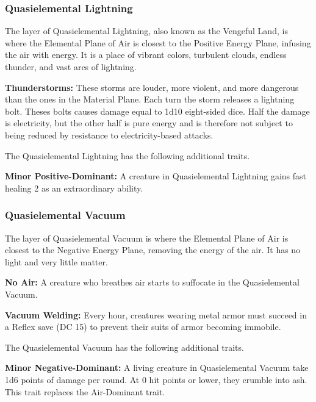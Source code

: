 \subsubsection{Quasielemental Lightning}
The layer of Quasielemental Lightning, also known as the Vengeful Land, is where the Elemental Plane of Air is closest to the Positive Energy Plane, infusing the air with energy. It is a place of vibrant colors, turbulent clouds, endless thunder, and vast arcs of lightning.

\textbf{Thunderstorms:} These storms are louder, more violent, and more dangerous than the ones in the Material Plane. Each turn the storm releases a lightning bolt. Theses bolts causes damage equal to 1d10 eight-sided dice. Half the damage is electricity, but the other half is pure energy and is therefore not subject to being reduced by resistance to electricity-based attacks.

The Quasielemental Lightning has the following additional traits.
\begin{itemize*}
\item \textbf{Minor Positive-Dominant:} A creature in Quasielemental Lightning gains fast healing 2 as an extraordinary ability.
\end{itemize*}

\subsubsection{Quasielemental Vacuum}
The layer of Quasielemental Vacuum is where the Elemental Plane of Air is closest to the Negative Energy Plane, removing the energy of the air. It has no light and very little matter.

\textbf{No Air:} A creature who breathes air starts to suffocate in the Quasielemental Vacuum.

\textbf{Vacuum Welding:} Every hour, creatures wearing metal armor must succeed in a Reflex save (DC 15) to prevent their suits of armor becoming immobile.

The Quasielemental Vacuum has the following additional traits.
\begin{itemize*}
\item \textbf{Minor Negative-Dominant:} A living creature in Quasielemental Vacuum take 1d6 points of damage per round. At 0 hit points or lower, they crumble into ash.\\

This trait replaces the Air-Dominant trait.
\end{itemize*}
